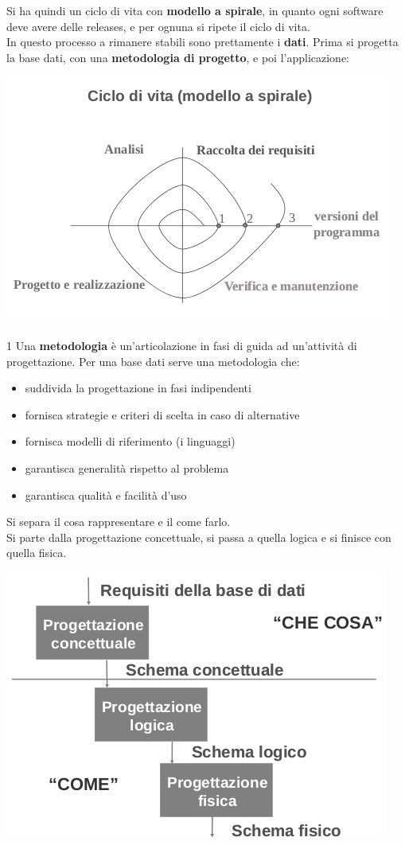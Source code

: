 \documentclass[a4paper,12pt, oneside]{book}
\begin{document}
Si ha quindi un ciclo di vita con \textbf{modello a spirale}, in quanto ogni software deve avere delle releases, e per ognuna si ripete il ciclo di vita.\\
In questo processo a rimanere stabili sono prettamente i \textbf{dati}. Prima si progetta la base dati, con una \textbf{metodologia di progetto}, e poi l'applicazione:
\begin{center}
\includegraphics[scale=2.8]{img/bas2.png}
\end{center}
1
Una \textbf{metodologia} è un'articolazione in fasi di guida ad un'attività di progettazione. Per una base dati serve una metodologia che:
\begin{itemize}
\item suddivida la progettazione in fasi indipendenti
\item fornisca strategie e criteri di scelta in caso di alternative
\item fornisca modelli di riferimento (i linguaggi)
\item garantisca generalità rispetto al problema
\item garantisca qualità e facilità d'uso
\end{itemize}
Si separa il cosa rappresentare e il come farlo.\\
Si parte dalla progettazione concettuale, si passa a quella logica e si finisce con quella fisica.
\begin{center}
\includegraphics[scale=2.5]{img/bas3.png}
\end{center}
\end{document}
